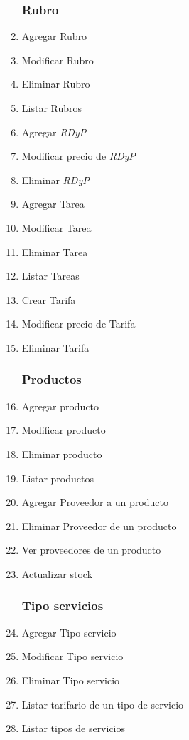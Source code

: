 \documentclass[12pt]{extarticle}
\begin{document}
\begin{spacing}{1.2}
\begin{multicols}{2}
\begin{enumerate}
        \subsubsection*{Rubro}
            \item Agregar Rubro
            \item Modificar Rubro 
            \item Eliminar Rubro
            \item Listar Rubros
            \item Agregar \textit{RDyP}
            \item Modificar precio de \textit{RDyP}
            \item Eliminar \textit{RDyP}
            \item Agregar Tarea
            \item Modificar Tarea
            \item Eliminar Tarea
            \item Listar Tareas
            \item Crear Tarifa
            \item Modificar precio de Tarifa
            \item Eliminar Tarifa
        \subsubsection*{Productos}
            \item Agregar producto
            \item Modificar producto
            \item Eliminar producto
            \item Listar productos
            \item Agregar Proveedor a un producto
            \item Eliminar Proveedor de un producto
            \item Ver proveedores de un producto
            \item Actualizar stock
        \subsubsection*{Tipo servicios}
            \item Agregar Tipo servicio
            \item Modificar Tipo servicio
            \item Eliminar Tipo servicio
            \item Listar tarifario de un tipo de servicio
            \item Listar tipos de servicios

\end{enumerate}
\end{multicols}
\end{spacing}
\end{document}
